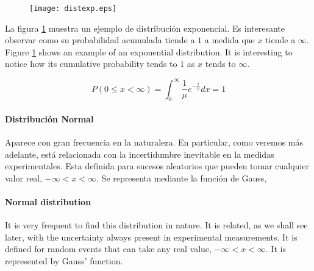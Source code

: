 \begin{figure}
\centering
\texttt{[image: distexp.eps]}
\label{fig:distexp}
\end{figure}

\begin{paracol}{2}
La figura \ref{fig:distexp} muestra un ejemplo de distribución exponencial. Es interesante observar como su probabilidad acumulada tiende a $1$ a medida que $x$ tiende a $\infty$.
\switchcolumn
Figure \ref{fig:distexp} shows an example of an exponential distribution. It is interesting to notice how its cumulative probability tends to $1$ as $x$ tends to $\infty$.
\end{paracol}

\begin{equation*}
P(0\leqslant x < \infty) = \int_0^{\infty}\frac{1}{\mu}e^{-\frac{x}{\mu}}dx = 1
\end{equation*}

\begin{paracol}{2}
\paragraph{Distribución Normal} Aparece con gran frecuencia en la naturaleza. En particular, como veremos más adelante, está relacionada con la incertidumbre inevitable en la medidas experimentales. Esta definida para sucesos aleatorios que pueden tomar cualquier valor real, $-\infty < x < \infty$. Se representa mediante la función de Gauss,
\switchcolumn
\paragraph{Normal distribution} It is very frequent to find this distribution in nature. It is related, as we shall see later, with the  uncertainty always present in experimental measurements. It is defined for random events that can take any real value, $-\infty < x < \infty$. It is represented by Gauss' function.
\end{paracol}

